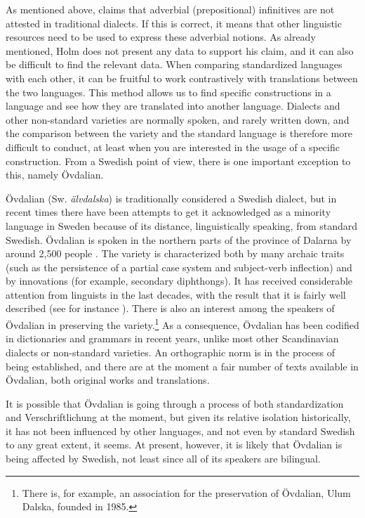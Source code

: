 \documentclass[output=paper]{langscibook}
\begin{document}
As mentioned above, \citet[27]{Holm1967} claims that adverbial (prepositional) infinitives are not attested in traditional dialects. If this is correct, it means that other linguistic resources need to be used to express these adverbial notions. As already mentioned, Holm does not present any data to support his claim, and it can also be difficult to find the relevant data. When comparing standardized languages with each other, it can be fruitful to work contrastively with translations between the two languages. This method allows us to find specific constructions in a language and see how they are translated into another language. Dialects and other non-standard varieties are normally spoken, and rarely written down, and the comparison between the variety and the standard language is therefore more difficult to conduct, at least when you are interested in the usage of a specific construction. From a Swedish point of view, there is one important exception to this, namely Övdalian. 

Övdalian (Sw. \textit{älvdalska}) is traditionally considered a Swedish dialect, but in recent times there have been attempts to get it acknowledged as a minority language in Sweden because of its distance, linguistically speaking, from standard Swedish. Övdalian is spoken in the northern parts of the province of Dalarna by around 2,500 people \citep[27]{Garbacz2009}. The variety is characterized both by many archaic traits (such as the persistence of a partial case system and subject-verb inflection) and by innovations (for example, secondary diphthongs). It has received considerable attention from linguists in the last decades, with the result that it is fairly well described (see for instance \citealt{Garbacz2009,BentzenEtAl2015}). There is also an interest among the speakers of Övdalian in preserving the variety.\footnote{There is, for example, an association for the preservation of Övdalian, Ulum Dalska, founded in 1985.} As a consequence, Övdalian has been codified in dictionaries and grammars in recent years, unlike most other Scandinavian dialects or non-standard varieties. An orthographic norm is in the process of being established, and there are at the moment a fair number of texts available in Övdalian, both original works and translations. 

It is possible that Övdalian is going through a process of both standardization and Verschriftlichung at the moment, but given its relative isolation historically, it has not been influenced by other languages, and not even by standard Swedish to any great extent, it seems. At present, however, it is likely that Övdalian is being affected by Swedish, not least since all of its speakers are bilingual. 
\end{document}
